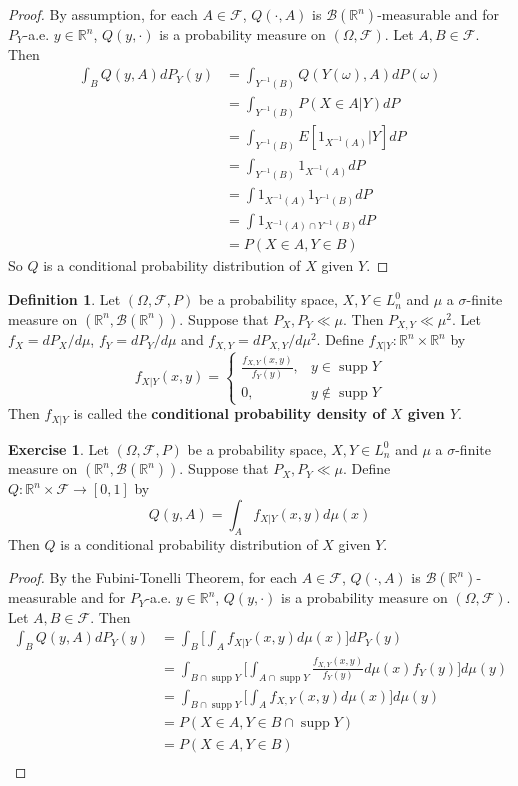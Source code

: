 \documentclass[12pt]{amsart}
\theoremstyle{definition}
\newtheorem{defn}[definition]{Definition}
\newtheorem{ex}[definition]{Exercise}
\newcommand{\sig}{\sigma}
\newcommand{\om}{\omega}
\newcommand{\Om}{\Omega}
\newcommand{\R}{\mathbb{R}}
\newcommand{\MB}{\mathcal{B}}
\newcommand{\MF}{\mathcal{F}}
\DeclareMathOperator{\supp}{supp}
\begin{document}
	\begin{proof}
	By assumption, for each $A \in \MF$, $Q(\cdot, A)$ is $\MB(\R^n)$-measurable and for $P_Y$-a.e. $y \in \R^n$, $Q(y, \cdot)$ is a probability measure on $(\Om, \MF)$. Let $A,B \in \MF$. Then
	\begin{align*}
	\int_B Q(y, A) dP_Y(y)
	&= \int_{Y^{-1}(B)} Q(Y(\om), A) dP(\om) \\
	&= \int_{Y^{-1}(B)}  P(X \in A|Y) dP \\
	&= \int_{Y^{-1}(B)}  E[1_{X^{-1}(A)}|Y] dP \\
	&= \int_{Y^{-1}(B)}  1_{X^{-1}(A)} dP \\
	&= \int 1_{X^{-1}(A)}  1_{Y^{-1}(B)} dP \\
	&= \int 1_{X^{-1}(A) \cap Y^{-1}(B)} dP \\
	&= P(X \in A, Y \in B)
	\end{align*}
	So $Q$ is a conditional probability distribution of $X$ given $Y$.
	\end{proof}
	
	\begin{defn}
	Let $(\Om, \MF, P)$ be a probability space, $X,Y \in L_n^0$ and $\mu$ a $\sig$-finite measure on $(\R^n, \MB(\R^n))$. Suppose that $P_X, P_Y \ll \mu$. Then $P_{X,Y} \ll \mu^2$. Let $f_X = dP_X/d \mu$, $f_Y = dP_Y/d \mu$ and $f_{X,Y} = dP_{X,Y}/d \mu^2$. Define $f_{X|Y}: \R^n \times \R^n$ by 
	\[
	f_{X|Y}(x,y) = 
	\begin{cases}
	\frac{f_{X,Y}(x,y)}{f_Y(y)},& y \in \supp Y \\
	0, &y \not \in \supp Y 
	\end{cases}
	\] 
	Then $f_{X|Y}$ is called the \textbf{conditional probability density of $X$ given $Y$}.
	\end{defn}	
	
	\begin{ex}
	Let $(\Om, \MF, P)$ be a probability space, $X,Y \in L_n^0$ and $\mu$ a $\sig$-finite measure on $(\R^n, \MB(\R^n))$. Suppose that $P_X, P_Y \ll \mu$. Define $Q: \R^n \times \MF \rightarrow [0,1]$ by 
	$$Q(y, A) = \int_A f_{X|Y}(x,y) d\mu(x)$$ 
	Then $Q$ is a conditional probability distribution of $X$ given $Y$.
	\end{ex}	
	
	\begin{proof}
	By the Fubini-Tonelli Theorem, for each $A \in \MF$, $Q(\cdot, A)$ is $\MB(\R^n)$-measurable and for $P_Y$-a.e. $y \in \R^n$, $Q(y, \cdot)$ is a probability measure on $(\Om, \MF)$. Let $A, B \in \MF$. Then 
	\begin{align*}
	\int_B Q(y, A) dP_Y(y)
	&= \int_B \bigg[ \int_A f_{X|Y}(x,y) d\mu(x) \bigg] dP_Y(y) \\
	&= \int_{B \cap \supp Y} \bigg[ \int_{A \cap \supp Y} \frac{f_{X,Y}(x,y)}{f_Y(y)} d\mu(x) f_Y(y) \bigg] d \mu(y) \\
	&= \int_{B \cap \supp Y}  \bigg[\int_A f_{X,Y}(x,y) d\mu(x) \bigg] d \mu(y) \\
	&= P(X \in A, Y \in B \cap \supp Y) \\
	&= P(X \in A, Y \in B) \\	
	\end{align*}
	\end{proof}
	
\end{document}
